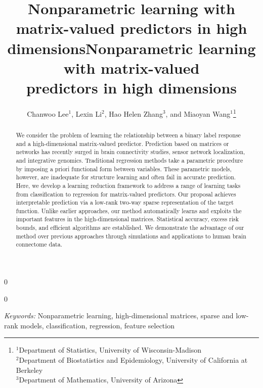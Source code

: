 \documentclass[11pt]{article}
\newcommand{\blind}{0}
\theoremstyle{definition}
\begin{document}
\blind
{   \date{}
  \title{\bf Nonparametric learning with matrix-valued predictors in high dimensions}
\author{ Chanwoo Lee$^{1}$, Lexin Li$^2$, Hao Helen Zhang$^3$, and Miaoyan Wang$^1$\footnote{
\hspace*{-.6cm}$^1$Department of Statistics, University of Wisconsin-Madison\\
$^2$Department of Biostatistics and Epidemiology, University of California at Berkeley\\
$^3$Department of Mathematics, University of Arizona}
}

    \maketitle
} \fi

\blind
{
 \date{}
  \title{\bf Nonparametric learning with matrix-valued \\predictors in high dimensions}
\author{}
\maketitle
} \fi

\begin{abstract}
We consider the problem of learning the relationship between a binary label response and a high-dimensional matrix-valued predictor. Prediction based on matrices or networks has recently surged in brain connectivity studies, sensor network localization, and integrative genomics. Traditional regression methods take a parametric procedure by imposing a priori functional form between variables. These parametric models, however, are inadequate for structure learning and often fail in accurate prediction. Here, we develop a learning reduction framework to address a range of learning tasks from classification to regression for matrix-valued predictors. Our proposal achieves interpretable prediction via a low-rank two-way sparse representation of the target function. Unlike earlier approaches, our method automatically learns and exploits the important features in the high-dimensional matrices. Statistical accuracy, excess risk bounds, and efficient algorithms are established. We demonstrate the advantage of our method over previous approaches through simulations and applications to human brain connectome data. 

\end{abstract}
\noindent%
{\it Keywords:}  Nonparametric learning, high-dimensional matrices, sparse and low-rank models, classification, regression, feature selection
\end{document}
